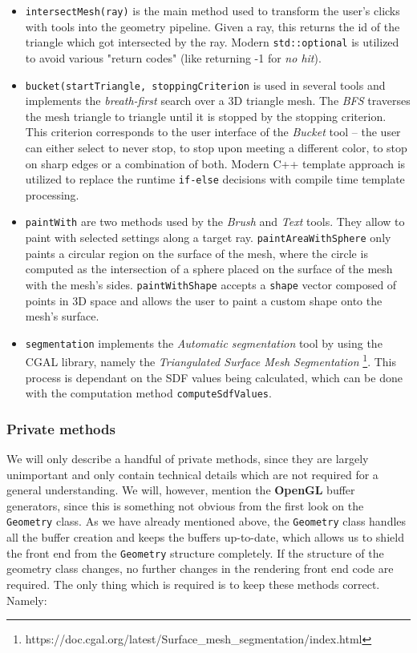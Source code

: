 \begin{itemize}
\item \texttt{intersectMesh(ray)} is the main method used to transform the user's clicks with tools into the geometry pipeline. Given a ray, this returns the id of the triangle which got intersected by the ray. Modern \texttt{std::optional} is utilized to avoid various "return codes" (like returning -1 for \textit{no hit}).

\item \texttt{bucket(startTriangle, stoppingCriterion} is used in several tools and implements the \textit{breath-first} search over a 3D triangle mesh. The \textit{BFS} traverses the mesh triangle to triangle until it is stopped by the stopping criterion. This criterion corresponds to the user interface of the \textit{Bucket} tool -- the user can either select to never stop, to stop upon meeting a different color, to stop on sharp edges or a combination of both. Modern C++ template approach is utilized to replace the runtime \texttt{if-else} decisions with compile time template processing.

\item \texttt{paintWith} are two methods used by the \textit{Brush} and \textit{Text} tools. They allow to paint with selected settings along a target ray. \texttt{paintAreaWithSphere} only paints a circular region on the surface of the mesh, where the circle is computed as the intersection of a sphere placed on the surface of the mesh with the mesh's sides. \texttt{paintWithShape} accepts a \texttt{shape} vector composed of points in 3D space and allows the user to paint a custom shape onto the mesh's surface.

\item \texttt{segmentation} implements the \textit{Automatic segmentation} tool by using the CGAL library, namely the \textit{Triangulated Surface Mesh Segmentation} \footnote{https://doc.cgal.org/latest/Surface\_mesh\_segmentation/index.html}. This process is dependant on the SDF values being calculated, which can be done with the computation method \texttt{computeSdfValues}.
\end{itemize}

\subsubsection{Private methods}

We will only describe a handful of private methods, since they are largely unimportant and only contain technical details which are not required for a general understanding. We will, however, mention the \textbf{OpenGL} buffer generators, since this is something not obvious from the first look on the \texttt{Geometry} class. As we have already mentioned above, the \texttt{Geometry} class handles all the buffer creation and keeps the buffers up-to-date, which allows us to shield the front end from the \texttt{Geometry} structure completely. If the structure of the geometry class changes, no further changes in the rendering front end code are required. The only thing which is required is to keep these methods correct. Namely:

